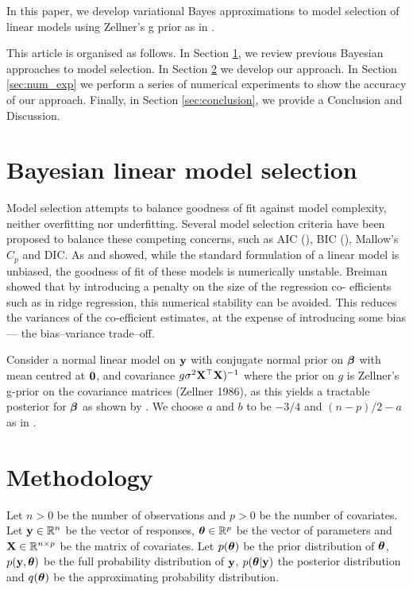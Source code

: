 \documentclass{amsart}[12pt]
\begin{document}


In this paper, we develop variational Bayes approximations to model selection of linear models using
Zellner's g prior as in \cite{Liang2008}.

This article is organised as follows. In Section \ref{sec:model_selection}, we review previous Bayesian
approaches to model selection. In Section \ref{sec:methodology} we develop our approach. In Section
\ref{sec:num_exp} we perform a series of numerical experiments to show the accuracy of our approach. Finally,
in Section \ref{sec:conclusion}, we provide a Conclusion and Discussion.

\section{Bayesian linear model selection}
\label{sec:model_selection}

Model selection attempts to balance goodness of fit against model complexity, neither overfitting nor
underfitting. Several model selection criteria have been proposed to balance these competing concerns, such as
AIC (\cite{DeLeeuw1992}), BIC (), Mallow's $C_p$ and DIC. As \cite{Breiman1996} and \cite{Efron2013} showed,
while  the standard formulation of a linear model is unbiased, the goodness of fit of these models is
numerically  unstable. Breiman showed that by introducing a penalty on the size of the regression co-
efficients such as  in ridge regression, this numerical stability can be avoided. This reduces the variances
of the co-efficient estimates, at the expense of introducing some bias --- the bias--variance trade--off.

Consider a normal linear model on ${\bf y}$ with conjugate normal prior on ${\boldsymbol \beta}$ with mean centred at ${\bf 0}$,
and covariance $g \sigma^2 {\bf X}^\top {\bf X})^{-1}$ where the prior on $g$ is Zellner's g-prior on the covariance
matrices (Zellner 1986), as this yields a tractable posterior for ${\boldsymbol \beta}$ as shown by \cite{Liang2008}. We choose $a$  and $b$ to be $-3/4$ and $(n - p)/2 - a$ as in \cite{Maruyama2011}.

\section{Methodology}
\label{sec:methodology}

Let $n > 0$ be the number of observations and $p > 0$ be the number of covariates. Let ${\bf y} \in {\mathbb{R}}^n$ be the
vector of responses, ${\boldsymbol \theta} \in {\mathbb{R}}^p$ be the vector of parameters and ${\bf X} \in {\mathbb{R}}^{n \times p}$ be the
matrix of covariates. Let $p({\boldsymbol \theta})$ be the prior distribution of ${\boldsymbol \theta}$, $p({\bf y}, {\boldsymbol \theta})$ be the full
probability distribution of ${\bf y}$, $p({\boldsymbol \theta} | {\bf y})$ the posterior distribution and $q({\boldsymbol \theta})$ be the
approximating probability distribution.
\end{document}
